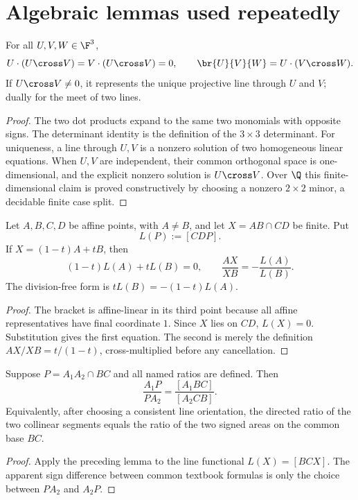 \section{Algebraic lemmas used repeatedly}

\begin{lemma}
For all $U,V,W\in\F^3$,
\[
U\cdot(U\cross V)=V\cdot(U\cross V)=0,
\qquad
\br{U}{V}{W}=U\cdot(V\cross W).
\]
If $U\cross V\ne0$, it represents the unique projective line through $U$ and $V$; dually for the meet of two lines.
\end{lemma}

\begin{proof}
The two dot products expand to the same two monomials with opposite signs.  The determinant identity is the definition of the $3\times3$ determinant.  For uniqueness, a line through $U,V$ is a nonzero solution of two homogeneous linear equations.  When $U,V$ are independent, their common orthogonal space is one-dimensional, and the explicit nonzero solution is $U\cross V$.  Over $\Q$ this finite-dimensional claim is proved constructively by choosing a nonzero $2\times2$ minor, a decidable finite case split.
\end{proof}

\begin{lemma}
Let $A,B,C,D$ be affine points, with $A\ne B$, and let $X=AB\cap CD$ be finite.  Put
\[
L(P):=[CDP].
\]
If $X=(1-t)A+tB$, then
\[
(1-t)L(A)+tL(B)=0,
\qquad
\frac{AX}{XB}=-\frac{L(A)}{L(B)}.
\]
The division-free form is $tL(B)=-(1-t)L(A)$.
\end{lemma}

\begin{proof}
The bracket is affine-linear in its third point because all affine representatives have final coordinate $1$.  Since $X$ lies on $CD$, $L(X)=0$.  Substitution gives the first equation.  The second is merely the definition $AX/XB=t/(1-t)$, cross-multiplied before any cancellation.
\end{proof}

\begin{lemma}
Suppose $P=A_1A_2\cap BC$ and all named ratios are defined.  Then
\[
\frac{A_1P}{PA_2}=\frac{[A_1BC]}{[A_2CB]}.
\]
Equivalently, after choosing a consistent line orientation, the directed ratio of the two collinear segments equals the ratio of the two signed areas on the common base $BC$.
\end{lemma}

\begin{proof}
Apply the preceding lemma to the line functional $L(X)=[BCX]$.  The apparent sign difference between common textbook formulas is only the choice between $PA_2$ and $A_2P$.
\end{proof}


